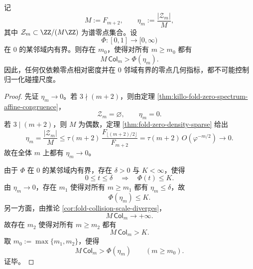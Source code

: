 \begin{theorem}[零点相对密度永远不是碰撞尺度的充分统计量]\label{thm:xi-time-part66-zero-density-never-sufficient}
记
\[
M:=F_{m+2},
\qquad
\eta_m:=\frac{|\mathcal Z_m|}{M},
\]
其中 \(\mathcal Z_m\subset \ZZ/(M\ZZ)\) 为谱零点集合。设
\[
\Phi:[0,1]\to [0,\infty)
\]
在 \(0\) 的某邻域内有界。则存在 \(m_0\)，使得对所有 \(m\ge m_0\) 都有
\[
\boxed{\;
M\,\mathsf{Col}_m>\Phi(\eta_m).\;}
\]
因此，任何仅依赖零点相对密度并在 \(0\) 邻域有界的零点几何指标，都不可能控制归一化碰撞尺度。
\end{theorem}
\begin{proof}
先证 \(\eta_m\to 0\)。若 \(3\nmid (m+2)\)，则由定理
\ref{thm:killo-fold-zero-spectrum-affine-congruence}，
\[
\mathcal Z_m=\varnothing,
\qquad
\eta_m=0.
\]
若 \(3\mid (m+2)\)，则 \(M\) 为偶数，定理 \ref{thm:fold-zero-density-sparse} 给出
\[
\eta_m=\frac{|\mathcal Z_m|}{M}
\le
\tau(m+2)\,\frac{F_{\lfloor (m+2)/2\rfloor}}{F_{m+2}}
=
\tau(m+2)\,O(\varphi^{-m/2})\to 0.
\]
故在全体 \(m\) 上都有 \(\eta_m\to 0\)。

由于 \(\Phi\) 在 \(0\) 的某邻域内有界，存在 \(\delta>0\) 与 \(K<\infty\)，使得
\[
0\le t\le \delta\quad\Longrightarrow\quad \Phi(t)\le K.
\]
由 \(\eta_m\to 0\)，存在 \(m_1\) 使得对所有 \(m\ge m_1\) 都有 \(\eta_m\le \delta\)，故
\[
\Phi(\eta_m)\le K.
\]
另一方面，由推论 \ref{cor:fold-collision-scale-diverges}，
\[
M\,\mathsf{Col}_m\longrightarrow +\infty.
\]
故存在 \(m_2\) 使得对所有 \(m\ge m_2\) 都有
\[
M\,\mathsf{Col}_m>K.
\]
取 \(m_0:=\max\{m_1,m_2\}\)，便得
\[
M\,\mathsf{Col}_m>\Phi(\eta_m)
\qquad (m\ge m_0).
\]
证毕。
\end{proof}


